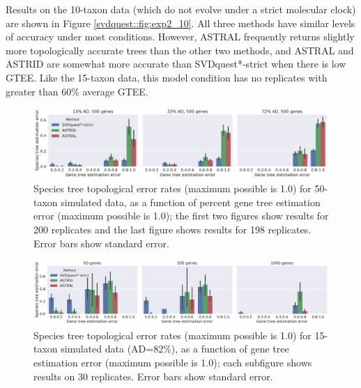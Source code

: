 Results on the 10-taxon data (which do not evolve under a strict
molecular clock) are shown in Figure \ref{svdquest::fig:exp2_10}.  All three
methods have similar levels of accuracy under most conditions.
However, ASTRAL frequently returns slightly more topologically
accurate trees than the other two methods, and ASTRAL and ASTRID are
somewhat more accurate than SVDquest*-strict when there is low GTEE. Like the
15-taxon data, this model condition has no replicates with greater than
60\% average GTEE.

\clearpage

\begin{figure}
  \centering
  \includegraphics[width=\textwidth]{svdquest-figs/coalescent_rfdists_500.pdf}
  \caption[Species tree topological error rates for 50-taxon simulated data]{Species tree topological error rates (maximum possible is 1.0) for 50-taxon simulated data, as a function of percent
    gene tree estimation error (maximum possible is 1.0); {the first two figures show results for 200 replicates and the last figure shows results for 198 replicates.} 
    Error bars show standard
    error.    
    }\label{svdquest::fig:exp2_50}
    \end{figure}


\begin{figure}
  \centering
  \includegraphics[width=\textwidth]{svdquest-figs/coalescent_rfdists_15tax.pdf}
  \caption[Species tree topological error rates for 15-taxon simulated data]{Species tree topological  error rates (maximum possible is 1.0) 
  for 15-taxon simulated data (AD=82\%), as a
    function of gene tree estimation error (maximum possible is 1.0); each subfigure shows results on 30 replicates. Error bars show standard
    error.   
    }
    \label{svdquest::fig:exp2_15}\end{figure}

